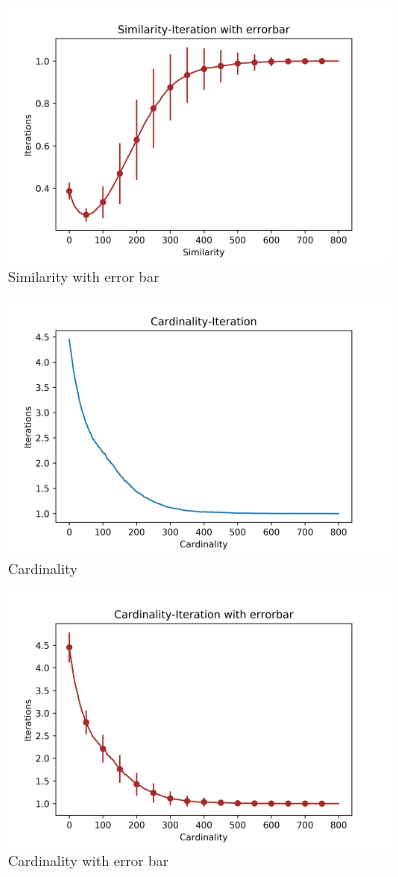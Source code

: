 \documentclass[a4paper,12pt]{article}
\begin{document}
%
	\begin{figure}[H]
	\centering
	\includegraphics[width=0.9\textwidth]{SimErr50_3_800_100}
	\caption{Similarity with error bar}\label{SimErr50_3_800_100}
    \end{figure}
%
	\begin{figure}[H]
	\centering
	\includegraphics[width=0.9\textwidth]{Card50_3_800_100}
	\caption{Cardinality}\label{Card50_3_800_100}
   \end{figure}
%
	\begin{figure}[H]
	\centering
	\includegraphics[width=0.9\textwidth]{CardErr50_3_800_100}
	\caption{Cardinality with error bar}\label{CardErr50_3_800_100}
    \end{figure}	
\end{document}
